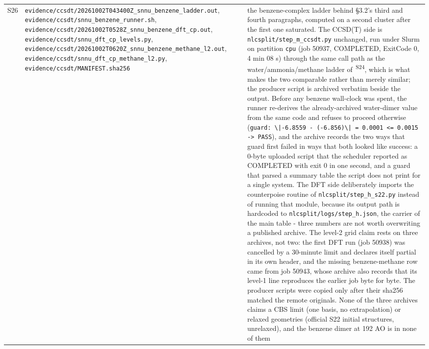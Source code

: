 \documentclass[11pt]{article}
\newcommand{\prov}[1]{\textsuperscript{\,#1}}
\begin{document}
\begin{longtable}{c>{\raggedright\arraybackslash}p{}>{\raggedright\arraybackslash}p{}}
S26 & \texttt{evidence/\allowbreak{}ccsdt/\allowbreak{}20261002T043400Z\_\allowbreak{}snnu\_\allowbreak{}benzene\_\allowbreak{}ladder.out}, \texttt{evidence/\allowbreak{}ccsdt/\allowbreak{}snnu\_\allowbreak{}benzene\_\allowbreak{}runner.sh}, \texttt{evidence/\allowbreak{}ccsdt/\allowbreak{}20261002T0528Z\_\allowbreak{}snnu\_\allowbreak{}benzene\_\allowbreak{}dft\_\allowbreak{}cp.out}, \texttt{evidence/\allowbreak{}ccsdt/\allowbreak{}snnu\_\allowbreak{}dft\_\allowbreak{}cp\_\allowbreak{}levels.py}, \texttt{evidence/\allowbreak{}ccsdt/\allowbreak{}20261002T0620Z\_\allowbreak{}snnu\_\allowbreak{}benzene\_\allowbreak{}methane\_\allowbreak{}l2.out}, \texttt{evidence/\allowbreak{}ccsdt/\allowbreak{}snnu\_\allowbreak{}dft\_\allowbreak{}cp\_\allowbreak{}methane\_\allowbreak{}l2.py}, \texttt{evidence/\allowbreak{}ccsdt/\allowbreak{}MANIFEST.sha256} & the benzene-complex ladder behind \S{}3.2's third and fourth paragraphs, computed on a second cluster after the first one saturated. The CCSD(T) side is \texttt{nlcsplit/step\_m\_ccsdt.py} unchanged, run under Slurm on partition \texttt{cpu} (job 50937, COMPLETED, ExitCode 0, 4 min 08 s) through the same call path as the water/ammonia/methane ladder of \prov{S24}, which is what makes the two comparable rather than merely similar; the producer script is archived verbatim beside the output. Before any benzene wall-clock was spent, the runner re-derives the already-archived water-dimer value from the same code and refuses to proceed otherwise (\texttt{guard: \textbackslash{}|-6.8559 - (-6.856)\textbackslash{}| = 0.0001 <= 0.0015 -> PASS}), and the archive records the two ways that guard first failed in ways that both looked like success: a 0-byte uploaded script that the scheduler reported as COMPLETED with exit 0 in one second, and a guard that parsed a summary table the script does not print for a single system. The DFT side deliberately imports the counterpoise routine of \texttt{nlcsplit/step\_h\_s22.py} instead of running that module, because its output path is hardcoded to \texttt{nlcsplit/logs/step\_h.json}, the carrier of the main table - three numbers are not worth overwriting a published archive. The level-2 grid claim rests on three archives, not two: the first DFT run (job 50938) was cancelled by a 30-minute limit and declares itself partial in its own header, and the missing benzene-methane row came from job 50943, whose archive also records that its level-1 line reproduces the earlier job byte for byte. The producer scripts were copied only after their sha256 matched the remote originals. None of the three archives claims a CBS limit (one basis, no extrapolation) or relaxed geometries (official S22 initial structures, unrelaxed), and the benzene dimer at 192 AO is in none of them \\

\end{longtable}
\end{document}

